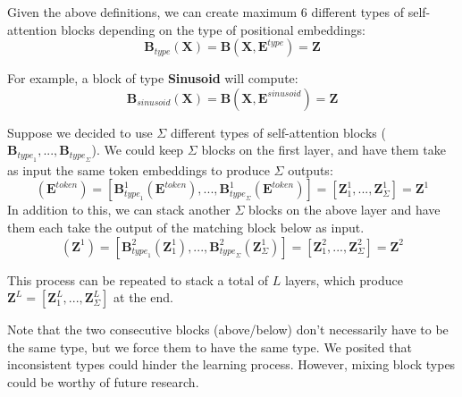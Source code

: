 Given the above definitions, we can create maximum 6 different types of self-attention blocks depending on the type of positional embeddings:
\begin{equation}
    \mathbf{B}_{type}(\mathbf{X}) = \mathbf{B}(\mathbf{X}, \mathbf{E}^{type}) = \mathbf{Z}
\end{equation}

For example, a block of type \textbf{Sinusoid} will compute:
\begin{displaymath}
   \mathbf{B}_{sinusoid}(\mathbf{X}) = \mathbf{B}(\mathbf{X}, \mathbf{E}^{sinusoid}) = \mathbf{Z}
\end{displaymath}

Suppose we decided to use $\Sigma$ different types of self-attention blocks ($\mathbf{B}_{{type}_1}, ..., \mathbf{B}_{{type}_\Sigma}$). We could keep $\Sigma$ blocks on the first layer, and have them take as input the same token embeddings to produce $\Sigma$ outputs: 
\begin{equation}
    [\mathbf{B}^1_{{type}_1}, ..., \mathbf{B}^1_{{type}_\Sigma}](\mathbf{E}^{token}) =
    [\mathbf{B}^1_{{type}_1}(\mathbf{E}^{token}), ..., \mathbf{B}^1_{{type}_\Sigma}(\mathbf{E}^{token})] =
    [\mathbf{Z}^1_1, ..., \mathbf{Z}^1_\Sigma] = \mathbf{Z}^1
\end{equation}
In addition to this, we can stack another $\Sigma$ blocks on the above layer and have them each take the output of the matching block below as input. 
\begin{equation}
    [\mathbf{B}^2_{{type}_1}, ..., \mathbf{B}^2_{{type}_\Sigma}](\mathbf{Z}^1) =
    [\mathbf{B}^2_{{type}_1}(\mathbf{Z}^1_1), ..., \mathbf{B}^2_{{type}_\Sigma}(\mathbf{Z}^1_\Sigma)] =
    [\mathbf{Z}^2_1, ..., \mathbf{Z}^2_\Sigma] = \mathbf{Z}^2
\end{equation}

This process can be repeated to stack a total of $L$ layers, which produce $\mathbf{Z}^L = [\mathbf{Z}^L_1, ..., \mathbf{Z}^L_\Sigma]$ at the end.

Note that the two consecutive blocks (above/below) don't necessarily have to be the same type, but we force them to have the same type. We posited that inconsistent types could hinder the learning process. However, mixing block types could be worthy of future research.